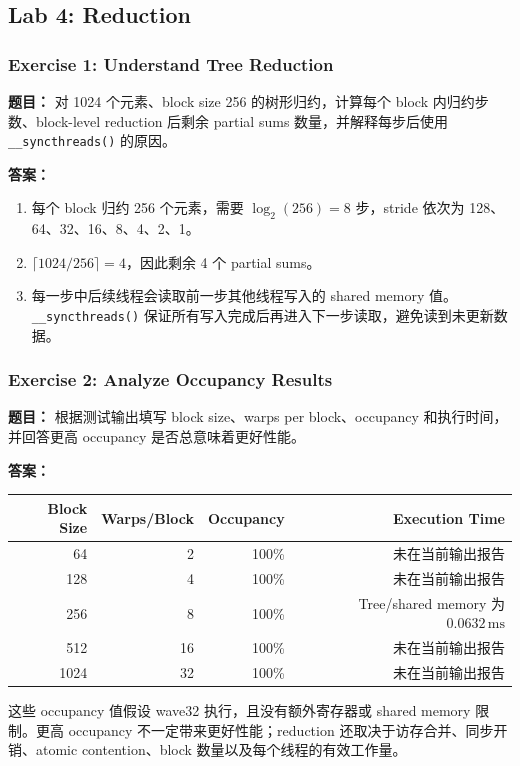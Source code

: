 \documentclass[10pt,a4paper]{article}
\begin{document}
\subsection{Lab 4: Reduction}

\subsubsection{Exercise 1: Understand Tree Reduction}
\noindent\textbf{题目：} 对 1024 个元素、block size 256 的树形归约，计算每个 block 内归约步数、block-level reduction 后剩余 partial sums 数量，并解释每步后使用 \texttt{\_\_syncthreads()} 的原因。

\noindent\textbf{答案：}
\begin{enumerate}[label=\arabic*.]
\item 每个 block 归约 256 个元素，需要 $\log_2(256)=8$ 步，stride 依次为 128、64、32、16、8、4、2、1。
\item $\lceil1024/256\rceil=4$，因此剩余 4 个 partial sums。
\item 每一步中后续线程会读取前一步其他线程写入的 shared memory 值。\texttt{\_\_syncthreads()} 保证所有写入完成后再进入下一步读取，避免读到未更新数据。
\end{enumerate}

\subsubsection{Exercise 2: Analyze Occupancy Results}
\noindent\textbf{题目：} 根据测试输出填写 block size、warps per block、occupancy 和执行时间，并回答更高 occupancy 是否总意味着更好性能。

\noindent\textbf{答案：}
\begin{center}
\small
\begin{tabular}{rrrr}
\toprule
Block Size & Warps/Block & Occupancy & Execution Time \\
\midrule
64 & 2 & 100\% & 未在当前输出报告 \\
128 & 4 & 100\% & 未在当前输出报告 \\
256 & 8 & 100\% & Tree/shared memory 为 $0.0632\,\mathrm{ms}$ \\
512 & 16 & 100\% & 未在当前输出报告 \\
1024 & 32 & 100\% & 未在当前输出报告 \\
\bottomrule
\end{tabular}
\end{center}
这些 occupancy 值假设 wave32 执行，且没有额外寄存器或 shared memory 限制。更高 occupancy 不一定带来更好性能；reduction 还取决于访存合并、同步开销、atomic contention、block 数量以及每个线程的有效工作量。
\end{document}

